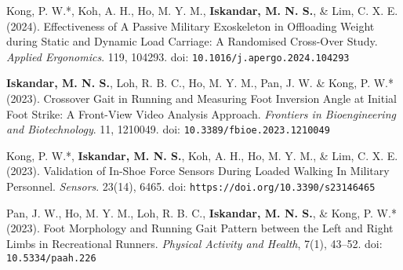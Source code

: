 \documentclass[../main.tex]{subfiles}
\begin{document}
        \begin{etaremune}
            \item\label{article: spm exoskeleton}{Kong, P. W.*, Koh, A. H., Ho, M. Y. M., \textbf{Iskandar, M. N. S.}, \& Lim, C. X. E. (2024). Effectiveness of A Passive Military Exoskeleton in Offloading Weight during Static and Dynamic Load Carriage: A Randomised Cross-Over Study. \textit{Applied Ergonomics}. 119, 104293. doi: \nolinkurl{10.1016/j.apergo.2024.104293} \href{https://doi.org/10.1016/j.apergo.2024.104293}{\faFilePdfO} \href{https://github.com/Shahril-Iskandar/publication-exoskeleton}{\faGithub}}

            \item\label{article: frontiers crossover gait} {\textbf{Iskandar, M. N. S.}, Loh, R. B. C., Ho, M. Y. M., Pan, J. W. \& Kong, P. W.* (2023). Crossover Gait in Running and Measuring Foot Inversion Angle at Initial Foot Strike: A Front-View Video Analysis Approach. \textit{Frontiers in Bioengineering and Biotechnology}. 11, 1210049. doi: \nolinkurl{10.3389/fbioe.2023.1210049} \href{https://doi.org/10.3389/fbioe.2023.1210049}{\faFilePdfO} \href{https://github.com/Shahril-Iskandar/publication-crossover-gait}{\faGithub}} %
            
            \item\label{article: sensors validation exoskeletal} {Kong, P. W.*, \textbf{Iskandar, M. N. S.}, Koh, A. H., Ho, M. Y. M., \& Lim, C. X. E. (2023). Validation of In-Shoe Force Sensors During Loaded Walking In Military Personnel. \textit{Sensors}. 23(14), 6465. doi: \nolinkurl{https://doi.org/10.3390/s23146465} \href{10.3390/s23146465}{\faFilePdfO} \href{https://github.com/Shahril-Iskandar/publication-loadsol-validation-military}{\faGithub}} %
            
            \item\label{article: paah foot morphology} {Pan, J. W., Ho, M. Y. M., Loh, R. B. C., \textbf{Iskandar, M. N. S.}, \& Kong, P. W.* (2023). Foot Morphology and Running Gait Pattern between the Left and Right Limbs in Recreational Runners. \textit{Physical Activity and Health}, 7(1), 43–52. doi: \nolinkurl{10.5334/paah.226} \href{https://doi.org/10.5334/paah.226}{\faFilePdfO}} %
        \end{etaremune}
                
\end{document}
